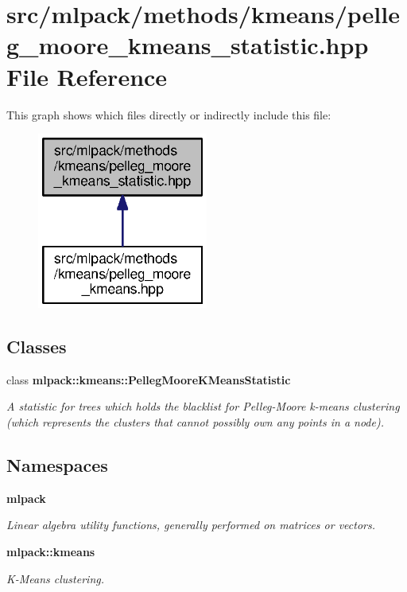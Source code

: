 \section{src/mlpack/methods/kmeans/pelleg\+\_\+moore\+\_\+kmeans\+\_\+statistic.hpp File Reference}
\label{pelleg__moore__kmeans__statistic_8hpp}
This graph shows which files directly or indirectly include this file\+:
\nopagebreak
\begin{figure}[H]
\begin{center}
\leavevmode
\includegraphics[width=159pt]{pelleg__moore__kmeans__statistic_8hpp__dep__incl}
\end{center}
\end{figure}
\subsection*{Classes}
\begin{DoxyCompactItemize}
\item 
class {\bf mlpack\+::kmeans\+::\+Pelleg\+Moore\+K\+Means\+Statistic}
\begin{DoxyCompactList}\small\item\em A statistic for trees which holds the blacklist for Pelleg-\/\+Moore k-\/means clustering (which represents the clusters that cannot possibly own any points in a node). \end{DoxyCompactList}\end{DoxyCompactItemize}
\subsection*{Namespaces}
\begin{DoxyCompactItemize}
\item 
 {\bf mlpack}
\begin{DoxyCompactList}\small\item\em Linear algebra utility functions, generally performed on matrices or vectors. \end{DoxyCompactList}\item 
 {\bf mlpack\+::kmeans}
\begin{DoxyCompactList}\small\item\em K-\/\+Means clustering. \end{DoxyCompactList}\end{DoxyCompactItemize}


